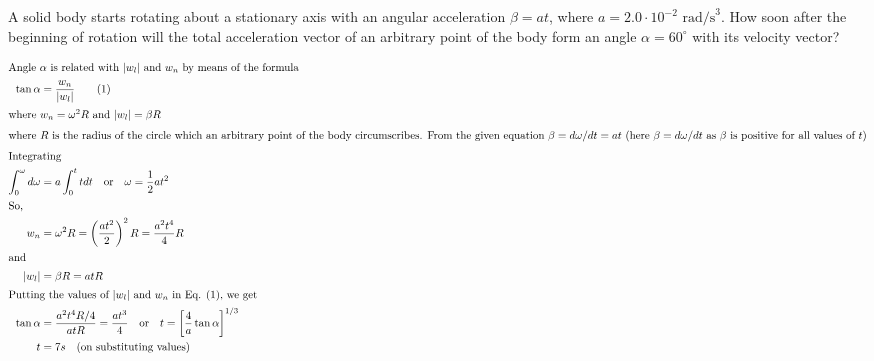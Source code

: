 
\item A solid body starts rotating about a stationary axis with an angular acceleration $\beta = at$, where $a = 2.0 \cdot 10^{-2} \text{ rad/s}^3$. How soon after the beginning of rotation will the total acceleration vector of an arbitrary point of the body form an angle $\alpha = 60^\circ$ with its velocity vector?

\begin{solution}
    \begin{center}
    \end{center}
    
    \begin{align*}
        \intertext{Angle $\alpha$ is related with $\left|w_l\right|$ and $w_n$ by means of the formula}
        \tan \alpha &= \dfrac{w_n}{\left|w_l\right|} \tag{1} \\
        \intertext{where $w_n = \omega^2 R$ and $\left|w_l\right| = \beta R$}
        \intertext{where $R$ is the radius of the circle which an arbitrary point of the body circumscribes. From the given equation $\beta = d\omega / dt = at$ (here $\beta = d\omega / dt$ as $\beta$ is positive for all values of $t$)}
        \intertext{Integrating} 
        \int_{0}^{\omega} d\omega &= a \int_{0}^{t} t dt \quad \text{or} \quad \omega = \dfrac{1}{2}at^2 \\
        \intertext{So,} 
        w_n &= \omega^2 R = \left(\dfrac{at^2}{2}\right)^2 R = \dfrac{a^2 t^4}{4} R \\
        \intertext{and} 
        \left|w_l\right| &= \beta R = at R \\
        \intertext{Putting the values of $\left|w_l\right|$ and $w_n$ in Eq. (1), we get}
        \tan \alpha &= \dfrac{a^2 t^4 R / 4}{atR} = \dfrac{at^3}{4} \quad \text{or} \quad t=\left[\dfrac{4}{a} \tan \alpha \right]^{1/3} \\
        t &= 7s \quad \text{(on substituting values)}
    \end{align*}
\end{solution}

